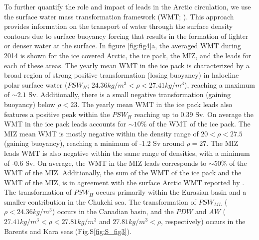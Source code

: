 \documentclass[draft]{agujournal2019}
\begin{document}
To further quantify the role and impact of leads in the Arctic circulation, we use the surface water mass transformation framework (WMT; \citealp{Walin_WMT_1982}). This approach provides information on the transport of water through the surface density contours due to surface buoyancy forcing that results in the  formation of lighter or denser water at the surface.
In figure \ref{fig:fig4}a, the averaged WMT during 2014 is shown for the ice covered Arctic, the ice pack, the MIZ, and the leads for each of these areas.
The yearly mean WMT in the ice pack is characterized by a broad region of strong positive transformation (losing buoyancy) in halocline polar surface water ($PSW_{H}$; $24.36 kg/m^3 < \rho < 27.41 kg/m^3$), reaching a maximum of $\sim 2.1$ Sv. Additionally, there is a small negative transformation (gaining buoyancy) below $\rho < 23$. 
The yearly mean WMT in the ice pack leads also features a positive peak within the $PSW_{H}$ reaching up to 0.39 Sv. On average the WMT in the ice pack leads accounts for $\sim 10\%$ of the WMT of the ice pack. The MIZ mean WMT is mostly negative within the density range of $20 < \rho < 27.5$ (gaining buoyancy), reaching a minimum of -1.2 Sv around $\rho = 27$.  The MIZ leads WMT is also negative within the same range of densities, with a minimum of -0.6 Sv. On average, the WMT in the MIZ leads corresponds to $\sim 50\%$ of the WMT of the MIZ. Additionally, the sum of the WMT of the ice pack and the WMT of the MIZ, is in agreement with the surface Arctic WMT reported by \citet{Pemberton_WMT_2015}. The transformation of $PSW_{H}$ occurs primarily within the Eurasian basin and a smaller contribution in the Chukchi sea. The transformation of $PSW_{ML}$ ($\rho < 24.36 kg/m^3$) occurs in the Canadian basin, and the $PDW$ and $AW$ ($27.41 kg/m^3 < \rho < 27.81 kg/m^3$ and $27.81 kg/m^3 < \rho$, respectively) occurs in the Barents and Kara seas (Fig.S\ref{fig:S_fig3}). 
\end{document}
